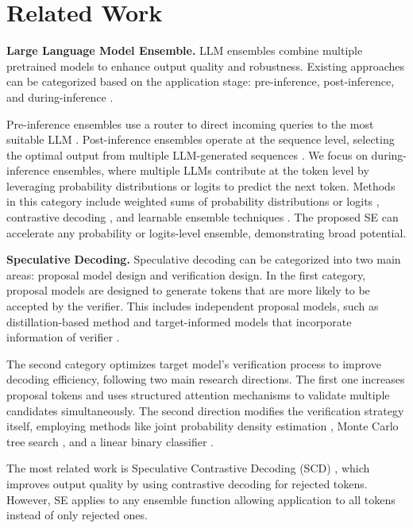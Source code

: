 \section{Related Work}
\noindent\textbf{Large Language Model Ensemble.}
LLM ensembles combine multiple pretrained models to enhance output quality and robustness. Existing approaches can be categorized based on the application stage: pre-inference, post-inference, and during-inference \cite{lu2024merge}. 

Pre-inference ensembles use a router to direct incoming queries to the most suitable LLM \cite{shnitzer2023large,lu2023routing,lu2024blending,ding2024hybrid}. Post-inference ensembles operate at the sequence level, selecting the optimal output from multiple LLM-generated sequences \cite{chen2023frugalgpt,lee2023ensemble,jiang2023llm}. We focus on during-inference ensembles, where multiple LLMs contribute at the token level by leveraging probability distributions or logits to predict the next token. Methods in this category include weighted sums of probability distributions or logits \cite{li2024purifying}, contrastive decoding \cite{li2023contrastive}, and learnable ensemble techniques \cite{furkan2024llm}. The proposed SE can accelerate any probability or logits-level ensemble, demonstrating broad potential.


\noindent\textbf{Speculative Decoding.}
Speculative decoding \cite{leviathan23, chen23} can be categorized into two main areas: proposal model design and verification design. In the first category, proposal models are designed to generate tokens that are more likely to be accepted by the verifier. This includes independent proposal models, such as distillation-based method \cite{zhou24} and target-informed models that incorporate information of verifier \cite{zhang2024,elhoushi2024,monea23,yi2024,monea23,li24a}.

The second category optimizes target model's verification process to improve decoding efficiency, following two main research directions. The first one increases proposal tokens and uses structured attention mechanisms \cite{miao2023specinfer, cai24,li24b,gong24} to validate multiple candidates simultaneously. The second direction modifies the verification strategy itself, employing methods like joint probability density estimation \cite{anonymous24a}, Monte Carlo tree search \cite{hu24}, and a linear binary classifier \cite{anonymous24b}.

The most related work is Speculative Contrastive Decoding (SCD) \cite{scd}, which improves output quality by using contrastive decoding for rejected tokens. However, SE applies to any ensemble function allowing application to all tokens instead of only rejected ones.


